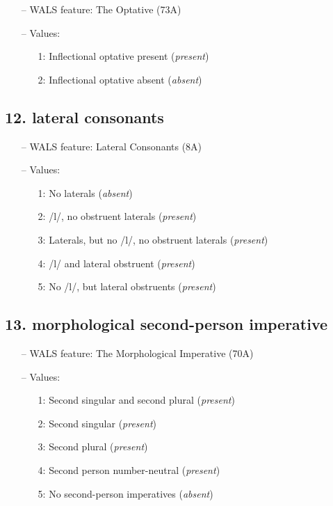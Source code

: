 \begin{itemize}
  \item[--] WALS feature: The Optative (73A)
  \item[--] Values:
  {\small
  \begin{enumerate}
    \item[1:] Inflectional optative present (\emph{present})
    \item[2:] Inflectional optative absent (\emph{absent})
  \end{enumerate}
  }
\end{itemize}


\subsection*{12. lateral consonants}

\begin{itemize}
  \item[--] WALS feature: Lateral Consonants (8A)
  \item[--] Values:
  {\small
  \begin{enumerate}
    \item[1:] No laterals (\emph{absent})
    \item[2:] /l/, no obstruent laterals (\emph{present})
    \item[3:] Laterals, but no /l/, no obstruent laterals (\emph{present})
    \item[4:] /l/ and lateral obstruent (\emph{present})
    \item[5:] No /l/, but lateral obstruents (\emph{present})
  \end{enumerate}
  }
\end{itemize}


\subsection*{13. morphological second-person imperative}

\begin{itemize}
  \item[--] WALS feature: The Morphological Imperative (70A)
  \item[--] Values:
  {\small
  \begin{enumerate}
    \item[1:] Second singular and second plural (\emph{present})
    \item[2:] Second singular (\emph{present})
    \item[3:] Second plural (\emph{present})
    \item[4:] Second person number-neutral (\emph{present})
    \item[5:] No second-person imperatives (\emph{absent})
  \end{enumerate}
  }
\end{itemize}


